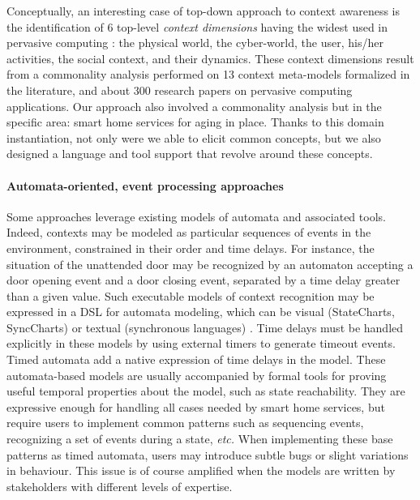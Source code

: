 
Conceptually, an interesting case of top-down approach to context awareness is the identification of 6 top-level {\em context dimensions} having the widest used in pervasive computing \cite{bauer2012comparison}: the physical world, the cyber-world, the user, his/her activities, the social context, and their dynamics. These context dimensions result from a commonality analysis performed on 13 context meta-models formalized in the literature, and about 300 research papers on pervasive computing applications. Our approach also involved a commonality analysis but in the specific area: smart home services for aging in place. Thanks to this domain instantiation, not only were we able to elicit common concepts, but we also designed a language and tool support that revolve around these concepts.

\paragraph{Automata-oriented, event processing approaches}

Some approaches leverage existing models of automata and associated tools. Indeed, contexts may be modeled as particular sequences of events in the environment, constrained in their order and time delays. For instance, the situation of the unattended door may be recognized by an automaton accepting a door opening event and a door closing event, separated by a time delay greater than a given value. Such executable models of context recognition may be expressed in a DSL for automata modeling, which can be visual (StateCharts, SyncCharts) or textual (synchronous languages) \cite{Gamatie2010}. Time delays must be handled explicitly in these models by using external timers to generate timeout events.  Timed automata \cite{Bengtsson2004} add a native expression of time delays in the model.  These automata-based models are usually accompanied by formal tools for proving useful temporal properties about the model, such as state reachability. They are expressive enough for handling all cases needed by smart home services, but require users to implement common patterns such as sequencing events, recognizing a set of events during a state, {\em etc.} When implementing these base patterns as timed automata, users may introduce subtle bugs or slight variations in behaviour. This issue is of course amplified when the models are written by stakeholders with different levels of expertise.

